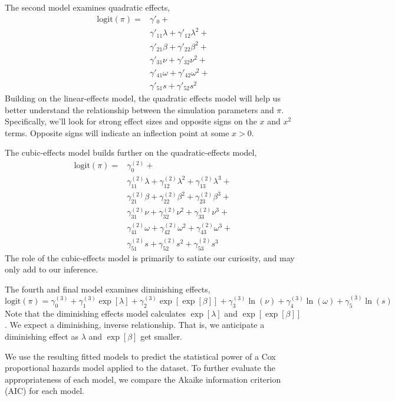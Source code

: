The second model examines quadratic effects,
%
\begin{equation}
\begin{aligned}
    \text{logit}(\pi) = & \gamma'_{0} + \\ &
        \gamma'_{11} \lambda + 
        \gamma'_{12} \lambda^2 +  \\ &
        \gamma'_{21} \beta +
        \gamma'_{22} \beta^2 + \\ &
        \gamma'_{31} \nu + 
        \gamma'_{32} \nu^2 +  \\ &
        \gamma'_{41} \omega +
        \gamma'_{42} \omega^2 + \\ &
        \gamma'_{51} s +
        \gamma'_{52} s^2
\end{aligned}
\end{equation}
%
Building on the linear-effects model, the quadratic effects model will help us better understand the relationship between the simulation parameters and $\pi$. Specifically, we'll look for strong effect sizes and opposite signs on the $x$ and $x^2$ terms. Opposite signs will indicate an inflection point at some $x > 0$. 

The cubic-effects model builds further on the quadratic-effects model,
%
\begin{equation}
\begin{aligned}
    \text{logit}(\pi) = &  \gamma^{(2)}_{0} + \\ &
        \gamma^{(2)}_{11} \lambda + 
        \gamma^{(2)}_{12} \lambda^2 + 
        \gamma^{(2)}_{13} \lambda^3 + \\ &
        \gamma^{(2)}_{21} \beta +
        \gamma^{(2)}_{22} \beta^2 +
        \gamma^{(2)}_{23} \beta^3 + \\ &
        \gamma^{(2)}_{31} \nu + 
        \gamma^{(2)}_{32} \nu^2 + 
        \gamma^{(2)}_{33} \nu^3 + \\ &
        \gamma^{(2)}_{41} \omega +
        \gamma^{(2)}_{42} \omega^2 +
        \gamma^{(2)}_{43} \omega^3 + \\ &
        \gamma^{(2)}_{51} s +
        \gamma^{(2)}_{52} s^2 +
        \gamma^{(2)}_{53} s^3
\end{aligned}
\end{equation}
%
The role of the cubic-effects model is primarily to satiate our curiosity, and may only add to our inference. 

The fourth and final model examines diminishing effects,
%
\begin{equation}
    \text{logit}(\pi)  = \gamma^{(3)}_{0} + 
        \gamma^{(3)}_{1} \exp[\lambda] + 
        \gamma^{(3)}_{2} \exp[\exp[\beta]] + 
        \gamma^{(3)}_{3} \ln(\nu) +
        \gamma^{(3)}_{4} \ln(\omega) +
        \gamma^{(3)}_{5} \ln(s)
\end{equation}
%
Note that the diminishing effects model calculates $\exp[\lambda]$ and $\exp[\exp[\beta]]$. We expect a diminishing, inverse relationship. That is, we anticipate a diminishing effect as $\lambda$ and $\exp[\beta]$ get smaller. 

We use the resulting fitted models to predict the statistical power of a Cox proportional hazards model applied to the dataset. To further evaluate the appropriateness of each model, we compare the Akaike information criterion (AIC) \cite{hyndman, sakamoto} for each model. 
